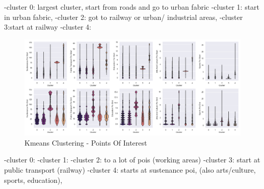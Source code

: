 -cluster 0: largest cluster, start from roads and go to urban fabric
-cluster 1: start in urban fabric,
-cluster 2: got to railway or urban/ industrial areas,
-cluster 3:start at railway
-cluster 4:

\begin{figure}[htp]
    \centering
    \includegraphics[width=1\textwidth]{Figures/Clustering/clusters_sustenance_poi_start.png}
    \caption{Kmeans Clustering - Points Of Interest}
    \label{fig:kmeans_poi}
\end{figure}

-cluster 0:
-cluster 1:
-cluster 2: to a lot of pois (working areas)
-cluster 3: start at public transport (railway)
-cluster 4: starts at sustenance poi, (also arts/culture, sports, education),
